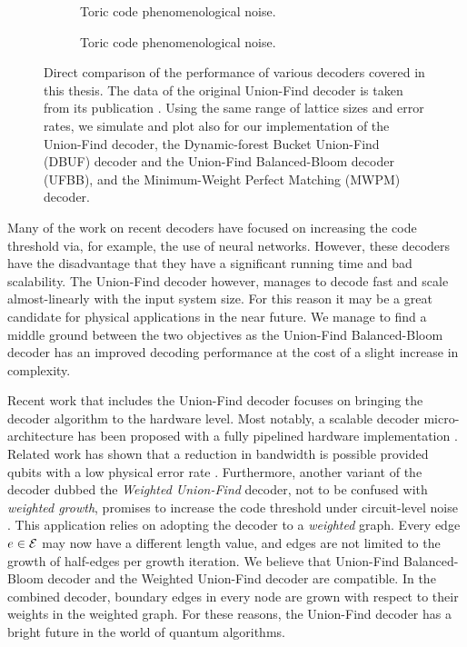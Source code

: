 \begin{figure}[htbp]
  \begin{subfigure}[b]{\textwidth}
    \begin{adjustbox}{Clip=0 1em 0 0}
      
    \end{adjustbox}
    \caption{Toric code phenomenological noise.}
  \end{subfigure}
  \begin{subfigure}[b]{\textwidth}
    \begin{adjustbox}{Clip=0 1em 0 0}
      
    \end{adjustbox}
    \caption{Toric code phenomenological noise.}
  \end{subfigure}
  \caption{Direct comparison of the performance of various decoders covered in this thesis. The data of the original Union-Find decoder is taken from its publication \cite{delfosse2017almost}. Using the same range of lattice sizes and error rates, we simulate and plot also for our implementation of the Union-Find decoder, the Dynamic-forest Bucket Union-Find (DBUF) decoder and the Union-Find Balanced-Bloom decoder (UFBB), and the Minimum-Weight Perfect Matching (MWPM) decoder.}\label{fig:directcomp}
\end{figure}

Many of the work on recent decoders have focused on increasing the code threshold via, for example, the use of neural networks. However, these decoders have the disadvantage that they have a significant running time and bad scalability. The Union-Find decoder however, manages to decode fast and scale almost-linearly with the input system size. For this reason it may be a great candidate for physical applications in the near future. We manage to find a middle ground between the two objectives as the Union-Find Balanced-Bloom decoder has an improved decoding performance at the cost of a slight increase in complexity. 

Recent work that includes the Union-Find decoder focuses on bringing the decoder algorithm to the hardware level. Most notably, a scalable decoder micro-architecture has been proposed with a fully pipelined hardware implementation \cite{das2020scalable}. Related work has shown that a reduction in bandwidth is possible provided qubits with a low physical error rate \cite{delfosse2020hierarchical}. Furthermore, another variant of the decoder dubbed the \emph{Weighted Union-Find} decoder, not to be confused with \emph{weighted growth}, promises to increase the code threshold under circuit-level noise \cite{huang2020fault}. This application relies on adopting the decoder to a \emph{weighted} graph. Every edge $e\in\mathcal{E}$ may now have a different length value, and edges are not limited to the growth of half-edges per growth iteration. We believe that Union-Find Balanced-Bloom decoder and the Weighted Union-Find decoder are compatible. In the combined decoder, boundary edges in every node are grown with respect to their weights in the weighted graph. For these reasons, the Union-Find decoder has a bright future in the world of quantum algorithms.
